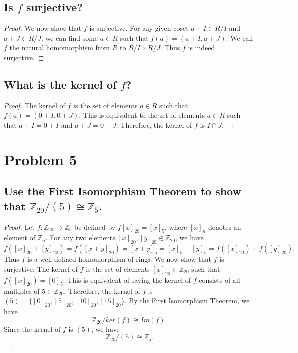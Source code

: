 \documentclass{article}
\theoremstyle{plain} %
\theoremstyle{definition} %
\begin{document}
\subsection*{Is $f$ surjective?}
\begin{proof}
    We now show that $f$ is surjective.
    For any given coset $a+I \in R/I$ and $a+J \in R/J$, we can find some $a \in R$ such that $f(a) = (a+I, a+J)$.
    We call $f$ the natural homomorphism from $R$ to $R/I \times R/J$. Thus $f$ is indeed surjective.
\end{proof}

\subsection*{What is the kernel of $f$?}
\begin{proof}
    The kernel of $f$ is the set of elements $a \in R$ such that $f(a) = (0+I, 0+J)$.
    This is equivalent to the set of elements $a \in R$ such that $a+I = 0+I$ and $a+J = 0+J$.
    Therefore, the kernel of $f$ is $I \cap J$.
\end{proof}

\section*{Problem 5}
\subsection*{Use the First Isomorphism Theorem to show that $\mathbb{Z}_{20}/(5) \cong \mathbb{Z}_5$.}
\begin{proof}
    Let $f: \mathbb{Z}_{20} \to \mathbb{Z}_5$ be defined by $f[x]_{20} = [x]_5$, where $[x]_n$ denotes an
    element of $\mathbb{Z}_n$.
    For any two elements $[x]_{20}, [y]_{20} \in \mathbb{Z}_{20}$, we have
    \[
        f([x]_{20} + [y]_{20}) = f([x+y]_{20}) = [x+y]_5 = [x]_5 + [y]_5 = f([x]_{20}) + f([y]_{20}).
    \]
    Thus $f$ is a well-defined homomorphism of rings.
    We now show that $f$ is surjective. The kernel of $f$ is the set of elements $[x]_{20} \in \mathbb{Z}_{20}$
    such that $f([x]_{20}) = [0]_5$.
    This is equivalent of saying the kernel of $f$ consists of all multiples of $5 \in \mathbb{Z}_{20}$.
    Therefore, the kernel of $f$ is $(5) = \{[0]_{20}, [5]_{20}, [10]_{20}, [15]_{20}\}$.
    By the First Isomorphism Theorem, we have
    \[
        \mathbb{Z}_{20}/ker(f) \cong Im(f).
    \]
    Since the kernel of $f$ is $(5)$, we have
    \[
        \mathbb{Z}_{20}/(5) \cong \mathbb{Z}_5.
    \]
\end{proof}
\end{document}

